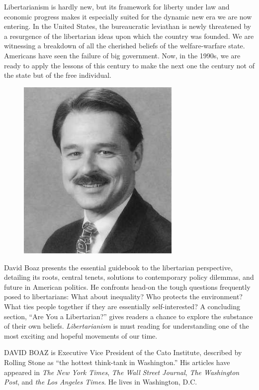 Libertarianism is hardly new, but its framework for liberty under law and economic progress makes it especially suited for the dynamic new era we are now entering. In the United States, the bureaucratic leviathan is newly threatened by a resurgence of the libertarian ideas upon which the country was founded. We are witnessing a breakdown of all the cherished beliefs of the welfare-warfare state. Americans have seen the failure of big government. Now, in the 1990s, we are ready to apply the lessons of this century to make the next one the century not of the state but of the free individual.
\begin{figure}[!htb]
	\centering
	\includegraphics[width=0.7\textwidth]{0}
\end{figure}
David Boaz presents the essential guidebook to the libertarian perspective, detailing its roots, central tenets, solutions to contemporary policy dilemmas, and future in American politics. He confronts head-on the tough questions frequently posed to libertarians: What about inequality? Who protects the environment? What ties people together if they are essentially self-interested? A concluding section, ``Are You a Libertarian?'' gives readers a chance to explore the substance of their own beliefs. \textit{Libertarianism} is must reading for understanding one of the most exciting and hopeful movements of our time.

DAVID BOAZ is Executive Vice President of the Cato Institute, described by Rolling Stone as ``the hottest think-tank in Washington.'' His articles have appeared in \textit{The New York Times}, \textit{The Wall Street Journal}, \textit{The Washington Post}, and \textit{the Los Angeles Times}. He lives in Washington, D.C.
\newpage

